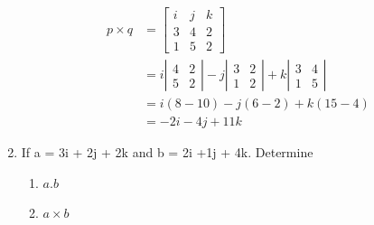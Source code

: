 \documentclass[12pt,titlepage]{article}
\begin{document}
\begin{enumerate}
{        \begin{align*}
            p \times q &= \left[ \begin{matrix}
                i & j & k \\
                3 & 4 & 2 \\
                1 & 5 & 2
            \end{matrix} \right] \\
            &= i \left| \begin{matrix}
                4 & 2 \\
                5 & 2
            \end{matrix} \right| - j \left| \begin{matrix}
                3 & 2 \\
                1 & 2
            \end{matrix} \right| + k \left| \begin{matrix}
                3 & 4 \\
                1 & 5
            \end{matrix} \right| \\
            &= i(8 - 10) - j(6 - 2) + k(15 - 4) \\
            &= -2i - 4j + 11k
        \end{align*}
    }
    \item {
        If a = 3i + 2j + 2k and b = 2i +1j + 4k. Determine
        \begin{enumerate}
            \item $a . b$
            \item $a \times b$
        \end{enumerate}

}
\end{enumerate}
\end{document}
